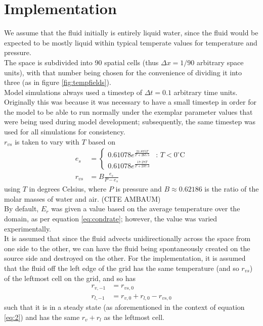 \documentclass[11pt]{article}
\begin{document}
\section{Implementation}
We assume that the fluid initially is entirely liquid water, since the fluid would be expected to be mostly liquid within typical temperate values for temperature and pressure. \\
The space is subdivided into 90 spatial cells (thus $\Delta x=1/90$ arbitrary space units), with that number being chosen for the convenience of dividing it into three (as in figure \ref{fig:tempfields}). \\
Model simulations always used a timestep of $\Delta t=0.1$ arbitrary time units. Originally this was because it was necessary to have a small timestep in order for the model to be able to run normally under the exemplar parameter values that were being used during model development; subsequently, the same timestep was used for all simulations for consistency. \\
$r_{vs}$ is taken to vary with $T$ based on
\begin{align}
e_s &= \begin{cases}
0.61078 e^{\frac{21.875T}{T+265.5}} & \text{: $T<0^{\circ}$C} \\
0.61078 e^{\frac{17.27T}{T+237.3}} &
\end{cases} \label{eq:tetens} \\
r_{vs} &= B\frac{e_s}{P-e_s} \label{eq:magic}
\end{align}
using $T$ in degrees Celsius, where $P$ is pressure and $B\approx0.62186$ is the ratio of the molar masses of water and air. (CITE AMBAUM) \\
By default, $E_r$ was given a value based on the average temperature over the domain, as per equation \ref{eq:condrate}; however, the value was varied experimentally. \\
It is assumed that since the fluid advects unidirectionally across the space from one side to the other, we can have the fluid being spontaneously created on the source side and destroyed on the other. For the implementation, it is assumed that the fluid off the left edge of the grid has the same temperature (and so $r_{vs}$) of the leftmost cell on the grid, and so has
\begin{align}
r_{v,-1} &= r_{vs,0} \label{eq:a} \\
r_{l,-1} &= r_{v,0}+r_{l,0}-r_{vs,0} \label{eq:b}
\end{align}
such that it is in a steady state (as aforementioned in the context of equation \ref{eq:2}) and has the same $r_v+r_l$ as the leftmost cell. \\
\end{document}
